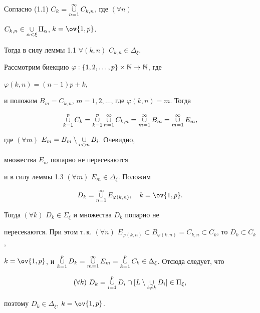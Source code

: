 \begin{pf} 


Согласно (1.1) $C_k=\mathop{\cup}\limits^\infty_{n=1}C_{k,n}$, где $(\forall n)$ 


$C_{k,n}\in\mathop{\cup}\limits_{\alpha<\xi}\Pi_\alpha$, $k=\ov{1,p}$. 


Тогда в силу леммы 1.1 $\forall(k,n)$ $C_{k,n}\in\Delta_\xi$. 


 


Рассмотрим биекцию $\varphi:\{1,2,\dotsc,p\}\times\Bbb N\to \Bbb N$, где 


$\varphi(k,n)=(n-1)p+k$, 


и положим $B_m=C_{k,n}$, $m=1,2,\dotsc$, где $\varphi(k,n)=m$. Тогда 


$$ 


\mycup^p_{k=1}C_k=\mycup^p_{k=1}\mycup^\infty_{n=1} 


C_{k,n}=\mycup^\infty_{m=1}B_m=\mycup^\infty_{m=1}E_m, 


$$ 


где $(\forall m)$ $E_m=B_m\setminus\mathop{\cup}\limits_{i<m}B_i$. Очевидно, 


множества $E_m$ попарно не пересекаются 


и в силу леммы 1.3 $(\forall m)$ $E_m\in\Delta_\xi$. Положим 


$$ 


D_k=\mycup^\infty_{n=1}E_{\varphi(k,n)},\quad k=\ov{1,p}. 


$$ 


Тогда $(\forall k)$ $D_k\in\Sigma_\xi$ и множества $D_k$ попарно не 


пересекаются. При этом т.\,к. $(\forall n)$ $E_{\varphi(k,n)}\subset 


B_{\varphi(k,n)}=C_{k,n} \subset C_k$, то $D_k\subset C_k$, 


$k=\ov{1,p}$, и $\mycup^p_{k=1}D_k= \mycup^\infty_{m=1}E_m= 


\mycup^p_{k=1}C_k\in\Delta_\xi$. Отсюда следует, что 


$$ 


(\forall k)\ D_k=\mycup^p_{i=1}D_i\cap[L\setminus 


\mycup_{i\ne k}D_i]\in\Pi_\xi, 


$$ 


поэтому $D_k\in\Delta_\xi$, $k=\ov{1,p}$. 


\end{pf} 


 


